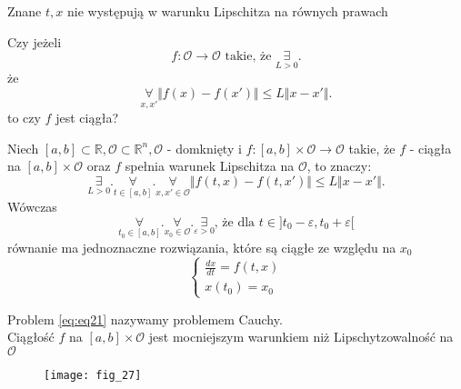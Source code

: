 \documentclass[../main.tex]{subfiles}
\begin{document}
        \begin{uwaga}
            Znane $t,x$ nie występują w warunku Lipschitza na równych prawach
        \end{uwaga}
        \begin{pytanie}
            Czy jeżeli \[
                f:\mathcal{O}\to\mathcal{O}\text{ takie, że } \underset{L>0}{\exists}
            .\] że \[
            \underset{x,x'}{\forall}  \Vert f(x) - f(x') \Vert \leq L \Vert x - x' \Vert
            .\] to czy $f $ jest ciągła?
        \end{pytanie}
        \begin{tw}
            Niech $[a,b] \subset \mathbb{R}, \mathcal{O}\subset\mathbb{R}^n, \mathcal{O}$ - domknięty i $f:[a,b]\times\mathcal{O}\to\mathcal{O}$ takie, że $f$ - ciągła na $[a,b]\times\mathcal{O}$ oraz $f$ spełnia warunek Lipschitza na $\mathcal{O}$, to znaczy:
            \[
                \underset{L>0}{\exists}. \underset{t\in[a,b]}{\forall}. \underset{x,x'\in\mathcal{O}}{\forall} \Vert f(t,x) - f(t,x') \Vert \leq L \Vert x-x' \Vert
            .\] Wówczas \[
            \underset{t_0\in[a,b]}{\forall} . \underset{x_0\in\mathcal{O}}{\forall} . \underset{\varepsilon>0}{\exists} \text{, że dla } t\in ]t_0-\varepsilon, t_0+\varepsilon[
            \]
            równanie ma jednoznaczne rozwiązania, które są ciągłe ze względu na $x_0$
            \begin{equation}
            \begin{cases}\label{eq:eq21}
                \frac{dx}{dt} = f(t,x)\\
                x(t_0) = x_0
            \end{cases}
            \end{equation}
        \end{tw}
        \begin{uwaga}
            Problem \ref{eq:eq21} nazywamy problemem Cauchy.\\
            Ciągłość $f$ na $[a,b]\times\mathcal{O}$ jest mocniejszym warunkiem niż Lipschytzowalność na $\mathcal{O}$
        \end{uwaga}
        \begin{figure}[h]
            \centering
            \texttt{[image: fig\_27]}
            \caption{}
            \label{fig:fig_27}
        \end{figure}
\end{document}
